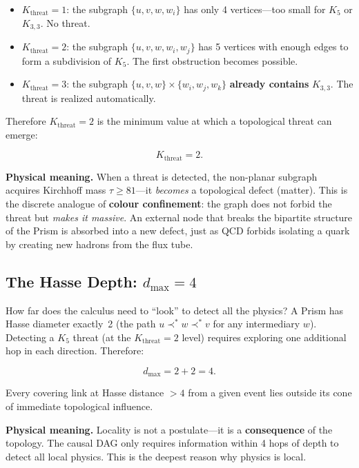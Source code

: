 \documentclass[11pt, a4paper, openany]{book}
\newcommand{\covers}{\prec^*}              %
\begin{document}
\begin{itemize}
  \item $K_{\mathrm{threat}} = 1$: the subgraph $\{u, v, w, w_i\}$ has
    only 4 vertices---too small for $K_5$ or $K_{3,3}$. No threat.
  \item $K_{\mathrm{threat}} = 2$: the subgraph
    $\{u, v, w, w_i, w_j\}$ has 5 vertices with enough edges to form a
    subdivision of $K_5$. The first obstruction becomes possible.
  \item $K_{\mathrm{threat}} = 3$: the subgraph
    $\{u, v, w\} \times \{w_i, w_j, w_k\}$ \textbf{already contains}
    $K_{3,3}$. The threat is realized automatically.
\end{itemize}

Therefore $K_{\mathrm{threat}} = 2$ is the minimum value at which a
topological threat can emerge:

\begin{equation}\label{eq:kuratowski-threshold}
  K_{\mathrm{threat}} = 2.
\end{equation}

\noindent
\textbf{Physical meaning.} When a threat is detected, the non-planar
subgraph acquires Kirchhoff mass $\tau \geq 81$---it \emph{becomes}
a topological defect (matter).  This is the discrete analogue of
\textbf{colour confinement}: the graph does not forbid the threat but
\emph{makes it massive}.  An external node that breaks the bipartite
structure of the Prism is absorbed into a new defect, just as QCD
forbids isolating a quark by creating new hadrons from the flux tube.

\subsection{The Hasse Depth: $d_{\max} = 4$}

How far does the calculus need to ``look'' to detect all the physics?
A Prism has Hasse diameter exactly~2 (the path
$u \covers w \covers v$ for any intermediary $w$). Detecting a $K_5$
threat (at the $K_{\mathrm{threat}} = 2$ level) requires exploring one
additional hop in each direction. Therefore:

\begin{equation}\label{eq:hasse-depth}
  d_{\max} = 2 + 2 = 4.
\end{equation}

Every covering link at Hasse distance $> 4$ from a given event lies
outside its cone of immediate topological influence.

\noindent
\textbf{Physical meaning.} Locality is not a postulate---it is a
\textbf{consequence} of the topology. The causal DAG only requires
information within 4 hops of depth to detect all local physics. This is
the deepest reason why physics is local.
\end{document}
